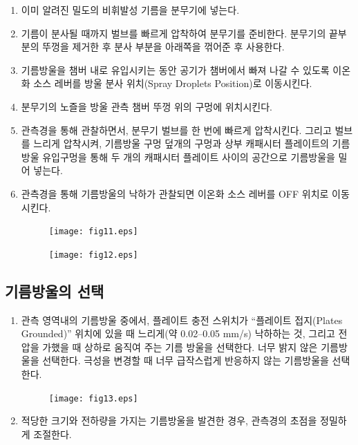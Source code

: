 \documentclass[a4paper, 10pt, nanum]{CSUniSchoolLabReport}
\begin{document}
\begin{enumerate}[label=\arabic*.]
	\item 이미 알려진 밀도의 비휘발성 기름을 분무기에 넣는다.
	\item 기름이 분사될 때까지 벌브를 빠르게 압착하여 분무기를 준비한다. 분무기의 끝부분의 뚜껑을 제거한 후 분사 부분을 아래쪽을 꺾어준 후 사용한다.
	\item 기름방울을 챔버 내로 유입시키는 동안 공기가 챔버에서 빠져 나갈 수 있도록 이온화 소스 레버를 방울 분사 위치(Spray Droplets Position)로 이동시킨다.
	\item 분무기의 노즐을 방울 관측 챔버 뚜껑 위의 구멍에 위치시킨다.
	\item 관측경을 통해 관찰하면서, 분무기 벌브를 한 번에 빠르게 압착시킨다. 그리고 벌브를 느리게 압착시켜, 기름방울 구멍 덮개의 구멍과 상부 캐패시터 플레이트의 기름방울 유입구멍을 통해 두 개의 캐패시터 플레이트 사이의 공간으로 기름방울을 밀어 넣는다.
	\item 관측경을 통해 기름방울의 낙하가 관찰되면 이온화 소스 레버를 OFF 위치로 이동시킨다.
	
	\begin{figure}[htb!]
		\centering
		\texttt{[image: fig11.eps]}
		\caption{}
		\label{fig:11}
	\end{figure}

	\begin{figure}[htb!]
		\centering
		\texttt{[image: fig12.eps]}
		\caption{}
		\label{fig:12}
	\end{figure}

\end{enumerate}

\subsection{기름방울의 선택}

\begin{enumerate}[label=\arabic*.]
	\item 관측 영역내의 기름방울 중에서, 플레이트 충전 스위치가 “플레이트 접지(Plates Grounded)” 위치에 있을 때 느리게(약 0.02–0.05 mm/s) 낙하하는 것, 그리고 전압을 가했을 때 상하로 움직여 주는 기름	방울을 선택한다. 너무 밝지 않은 기름방울을 선택한다. 극성을 변경할 때 너무 급작스럽게 반응하지 않는 기름방울을 선택한다.
	
	\begin{figure}[htb!]
		\centering
		\texttt{[image: fig13.eps]}
		\caption{}
		\label{fig:13}
	\end{figure}

	\item 적당한 크기와 전하량을 가지는 기름방울을 발견한 경우, 관측경의 초점을 정밀하게 조절한다.  
\end{enumerate}
\end{document}
